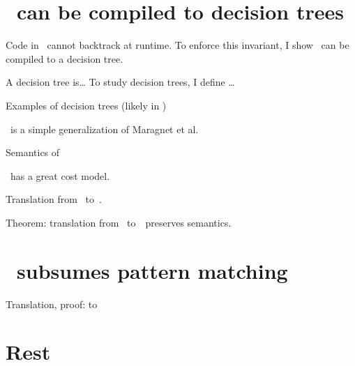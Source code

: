 \documentclass[manuscript,screen,review, 12pt, nonacm]{acmart}
\begin{document}
\begin{outline}[enumerate]



\section{\VMinus\ can be compiled to decision trees}
Code in \VMinus\ cannot backtrack at runtime. To enforce this invariant, 
I show \VMinus\ can be compiled to a decision tree. 

A decision tree is\dots
To study decision trees, I define \D\dots

Examples of decision trees (likely in \D )

\D\ is a simple generalization of Maragnet et al. 

Semantics of \D 

\D\ has a great cost model. 

Translation from \VMinus\ to~\D. 

Theorem: translation from \VMinus\ to~\D\ preserves semantics. 

\section{\VMinus\ subsumes pattern matching}
\1 Translation, proof: \PPlus to \VMinus
\section{Rest}
\end{outline}





    
\end{document}
